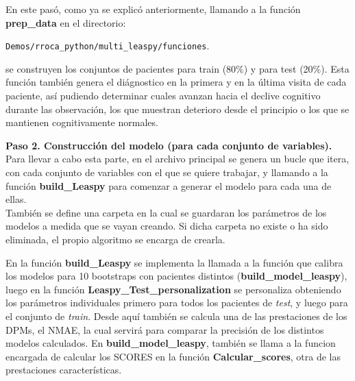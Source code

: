 \begin{description}
	En este pasó, como ya se explicó anteriormente, llamando a la función \textbf{prep\_data} en el directorio:
	\begin{center}
		\texttt{Demos/rroca\_python/multi\_leaspy/funciones}. 
	\end{center} 
	se construyen los conjuntos de pacientes para train (80\%) y para test (20\%). Esta función también genera el diágnostico en la primera y en la última visita de cada paciente, así pudiendo determinar cuales avanzan hacia el declive cognitivo durante las observación, los que muestran deterioro desde el principio o los que se mantienen cognitivamente normales.
	
	\item {\textbf{Paso 2. Construcción del modelo (para cada conjunto de variables).}}\\
	
	Para llevar a cabo esta parte, en el archivo principal se genera un bucle que itera, con cada conjunto de variables con el que se quiere trabajar, y llamando a la función \textbf{build\_Leaspy} para comenzar a generar el modelo para cada una de ellas. \\
	
	También se define una carpeta en la cual se guardaran los parámetros de los modelos a medida que se vayan creando. Si dicha carpeta no existe o ha sido eliminada, el propio algoritmo se encarga de crearla.
	
	En la función \textbf{build\_Leaspy} se implementa la llamada a la función que calibra los modelos para 10 bootstraps con pacientes distintos (\textbf{build\_model\_leaspy}), luego en la función \textbf{Leaspy\_Test\_personalization} se personaliza obteniendo los parámetros individuales primero para todos los pacientes de \textit{test}, y luego para el conjunto de \textit{train}. Desde aquí también se calcula una de las prestaciones de los DPMs, el NMAE, la cual servirá para comparar la precisión de los distintos modelos calculados. En \textbf{build\_model\_leaspy}, también se llama a la funcion encargada de calcular los SCORES en la función \textbf{Calcular\_scores}, otra de las prestaciones características.\\
		

\end{description}
